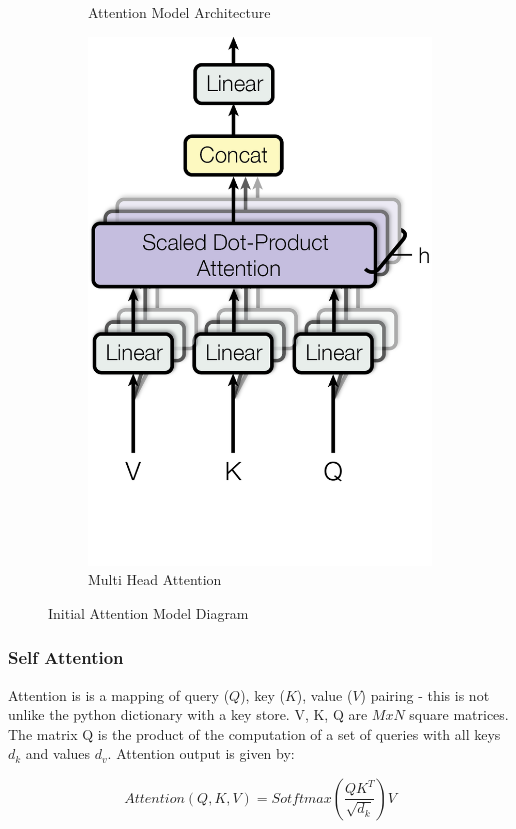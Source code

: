 \begin{figure}
\begin{subfigure}[b]{0.3\textwidth}
        \caption{Attention Model Architecture \cite{Vaswani2017a}}
        \label{fig:Vaswani2017a_trans_arch}
    \end{subfigure}
     \hspace{10mm}
    \begin{subfigure}[b]{0.3\textwidth}
        \includegraphics[height=\textwidth]{figures/research_methadology/multi-head attention.png}
        \caption{Multi Head Attention  \cite{Vaswani2017a}}
        \label{fig:Vaswani2017a_attention}
    \end{subfigure}
    \caption{Initial Attention Model Diagram}
    \label{fig:transformers}
\end{figure}

\subsubsection{Self Attention\label{Attenion_s}}
Attention is is a mapping of query ($Q$), key ($K$), value ($V$) pairing - this is not unlike the python dictionary with a key store. V, K, Q are $MxN$ square matrices. The matrix Q is the product of the computation of a set of queries with all keys\cite{Vaswani2017a} $d_k$ and values $d_v$.  Attention output is given by:

\begin{equation}
    Attention(Q,K,V) = Sotftmax(\dfrac{QK^T}{\sqrt{d_k}})V
\end{equation}

